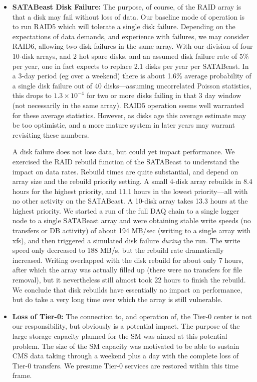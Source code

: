 \begin{itemize}
\item {\bf SATABeast Disk Failure:} The purpose, of course,
of the RAID array is that a disk may fail without loss of data.
Our baseline  mode of operation is to run RAID5 which will tolerate
a single disk failure.
Depending on the expectations of data demands, and experience with failures,
we may consider RAID6, allowing two disk failures in the same array.
With our division of four 10-disk arrays, and 2 hot spare disks,
and an assumed disk failure rate of 5\% per year, one in fact expects
to replace 2.1 disks per year per SATABeast.
In a 3-day period (eg over a weekend) there is about 1.6\% average probability
of a single disk failure out of 40 disks---assuming uncorrelated Poisson statistics,
this drops to $1.3\times 10^{-4}$ for two or more disks failing in that 3 day window
(not necessarily in the same array).
RAID5 operation seems well warranted for these average statistics.
However, as disks age this average estimate may be too optimistic,
and a more mature system in later years may warrant revisiting these numbers.

A disk failure does not lose data, but could yet impact performance.
We exercised the RAID rebuild function of the SATABeast to understand the
impact on data rates.
Rebuild times are quite substantial, and depend on array size and the rebuild 
priority setting. A small 4-disk array rebuilds in 8.4 hours for the highest
priority, and 11.1 hours in the lowest priority---all with no other activity on the SATABeast.
A 10-disk array takes 13.3 hours at the highest priority.
We started a run of the full DAQ chain to a single logger node 
to a single SATABeast array and were obtaining stable write speeds 
(no transfers or DB activity) 
of about 194 MB/sec (writing to a single array with xfs), 
and then triggered a simulated  disk failure {\it during} the run.
The write speed only decreased to 188 MB/s, but the rebuild rate dramatically increased.
Writing overlapped with the disk rebuild for about only 7 hours, after which
the array was actually filled up (there were no transfers for file removal),
but it nevertheless still almost took 22 hours to finish the rebuild.
We conclude that disk rebuilds have essentially no impact on performance,
but do take a very long time over which the array is still vulnerable.

\item {\bf Loss of Tier-0:} The connection to, and operation of, the Tier-0 center
is not our responsibility, but obviously is a potential impact.
The purpose of the large storage capacity planned for the SM was
aimed at this potential problem.
The size of the SM capacity was motivated to be able to sustain CMS data taking
through a weekend plus a day with the complete loss of Tier-0 transfers.
We presume Tier-0 services are restored within this time frame.
\end{itemize}

